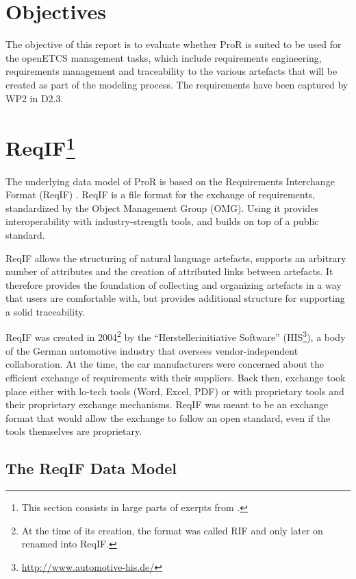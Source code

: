 \documentclass{template/openetcs_report}
\begin{document}
\section{Objectives}

The objective of this report is to evaluate whether ProR is suited to be used for the openETCS management tasks, which include requirements engineering, requirements management and traceability to the various artefacts that will be created as part of the modeling process.  The requirements have been captured by WP2 in D2.3.

\section{ReqIF\footnote{This section consists in large parts of exerpts from \cite{RMF_Mark_Book_Jastram_2013}.}}

The underlying data model of ProR is based on the Requirements Interchange Format (ReqIF) \cite{omg_requirements_2011}.  ReqIF is a file format for the exchange of requirements, standardized by the Object Management Group (OMG).  Using it provides interoperability with industry-strength tools, and builds on top of a public standard.

ReqIF allows the structuring of natural language artefacts, supports an arbitrary number of attributes and the creation of attributed links between artefacts.  It therefore provides the foundation of collecting and organizing artefacts in a way that users are comfortable with, but provides additional structure for supporting a solid traceability.

ReqIF was created in 2004\footnote{At the time of its creation, the format was called RIF and only later on renamed into ReqIF.} by the ``Herstellerinitiative Software'' (HIS\footnote{\url{http://www.automotive-his.de/}}), a body of the German automotive industry that oversees vendor-independent collaboration.  At the time, the car manufacturers were concerned about the efficient exchange of requirements with their suppliers.  Back then, exchange took place either with lo-tech tools (Word, Excel, PDF) or with proprietary tools and their proprietary exchange mechanisms.  ReqIF was meant to be an exchange format that would allow the exchange to follow an open standard, even if the tools themselves are proprietary.

\subsection{The ReqIF Data Model}
\end{document}
